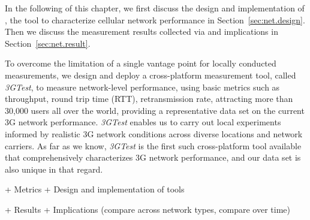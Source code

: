 In the following of this chapter, we first discuss the design and implementation of \mobiperf, the tool to characterize cellular network performance in Section~\ref{sec:net.design}. Then we discuss the measurement results collected via \mobiperf and implications in Section~\ref{sec:net.result}.


\label{sec:net.design}


To overcome the limitation of a single vantage point for locally
conducted measurements, we design and deploy a cross-platform
measurement tool, called {\em 3GTest}, to measure network-level 
performance, using basic metrics such as throughput, round trip 
time (RTT), retransmission rate, \etc attracting more than 30,000 
users all over the world, providing a representative data set on 
the current 3G network performance. {\em 3GTest} enables us to 
carry out local experiments informed by realistic 3G network 
conditions across diverse locations and network carriers. As far 
as we know, \emph{3GTest} is the first such cross-platform tool 
available that comprehensively characterizes 3G network performance, 
and our data set is also unique in that regard.



+ Metrics
+ Design and implementation of tools

\label{sec:net.result}
+ Results
+ Implications (compare across network types, compare over time)
